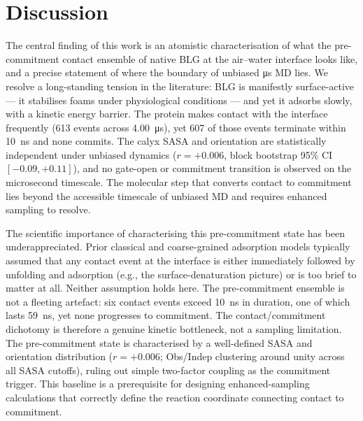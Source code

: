 \documentclass[11pt,a4paper]{article}
\begin{document}
\section{Discussion}

The central finding of this work is an atomistic characterisation of
what the pre-commitment contact ensemble of native BLG at the air--water
interface looks like, and a precise statement of where the boundary of
unbiased \si{\micro\second} MD lies. We resolve a long-standing tension
in the literature: BLG is manifestly surface-active --- it stabilises
foams under physiological conditions --- and yet it adsorbs slowly, with
a kinetic energy barrier\citep{Cornec1999}. The protein makes contact
with the interface frequently (\num{613} events across
\SI{4.00}{\micro\second}), yet \num{607} of those events terminate
within \SI{10}{\nano\second} and none commits. The calyx SASA and
orientation are statistically independent under unbiased dynamics
($r = +0.006$, block bootstrap 95\% CI $[-0.09, +0.11]$), and no gate-open or commitment transition
is observed on the microsecond timescale. The molecular step that
converts contact to commitment lies beyond the accessible timescale of
unbiased MD and requires enhanced sampling to resolve.

The scientific importance of characterising this pre-commitment state
has been underappreciated. Prior classical and coarse-grained adsorption
models typically assumed that any contact event at the interface is
either immediately followed by unfolding and adsorption (e.g., the
surface-denaturation picture\citep{Graham1979}) or is too brief to
matter at all. Neither assumption holds here. The pre-commitment
ensemble is not a fleeting artefact: six contact events exceed
\SI{10}{\nano\second} in duration, one of which lasts \SI{59}{\nano\second},
yet none progresses to commitment. The contact/commitment dichotomy is
therefore a genuine kinetic bottleneck, not a sampling limitation.
The pre-commitment state is characterised by a well-defined SASA and
orientation distribution ($r = +0.006$; Obs/Indep clustering around
unity across all SASA cutoffs), ruling out simple two-factor coupling
as the commitment trigger. This baseline is a prerequisite for
designing enhanced-sampling calculations that correctly define the
reaction coordinate connecting contact to commitment.
\end{document}
